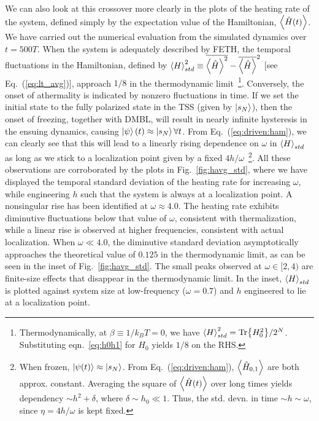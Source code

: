 \documentclass[%
reprint,
superscriptaddress,
amsmath,amssymb,
aps,
prb,
showkeys,
]{revtex4-2}
\begin{document}
We can also look at this crossover more clearly in the plots of the heating rate of the system, defined simply by the expectation value of the Hamiltonian, $\expval{\hat{H}(t)}$. We have carried out the numerical evaluation from the simulated dynamics over $t=500 T$. When the system is adequately described by FETH, the temporal fluctuations in the {Hamiltonian}, defined by $\expval{H}^2_{std}\equiv \overline{\expval{\hat{H}}^2}-\overline{\expval{\hat{H}}}^2$ [see Eq.~(\ref{eq:lt_avg})], approach $1/8$ in the thermodynamic limit~\footnote{Thermodynamically, at $\beta\equiv 1/k_BT=0$, we have $\expval{H}^2_{std}=\Tr{H^2_0}/2^N$. Substituting eqn.~\ref{eq:h0h1} for $H_0$ yields $1/8$ on the RHS.}. Conversely, the onset of athermality is indicated by nonzero fluctuations in time. If we set the initial state to the fully polarized state in the TSS (given by $\ket{s_N}$), then the 
onset of freezing, together with DMBL, will result in nearly infinite hysteresis in the ensuing dynamics, causing $\ket{\psi}(t)\approx \ket{s_N} \forall t$. From Eq.~(\ref{eq:driven:ham}), we can clearly see that this will lead to a linearly rising dependence on $\omega$ in $\expval{H}_{std}$ as long as we stick to a localization point given by a fixed $4h/\omega$~\footnote{When frozen, $\ket{\psi(t)}\approx \ket{s_N}$. From Eq.~(\ref{eq:driven:ham}), $\expval{\hat{H}_{0,1}}$ are both approx. constant. Averaging the square of $\expval{\hat{H}(t)}$ over long times yields dependency  $\sim h^2 + \delta$, where $\delta\sim h_0\ll 1$. Thus, the std. devn. in time $\sim h\sim \omega$, since $\eta=4h/\omega$ is kept fixed.}. All these observations are corroborated by the plots in Fig.~\ref{fig:havg_std}, where we have displayed the temporal standard deviation of the heating rate for increasing $\omega$, while engineering $h$ such that the system is always at a localization point. A nonsingular rise has been identified at $\omega \approx 4.0$. The heating rate exhibits diminutive fluctuations below that value of $\omega$, consistent with thermalization, while a linear rise is observed at higher frequencies, consistent with actual localization. When $\omega \ll 4.0$, the diminutive standard deviation asymptotically approaches the theoretical value of $0.125$ in the thermodynamic limit, as can be seen in the inset of Fig.~\ref{fig:havg_std}. The small peaks observed at $\omega\in [2, 4)$ are finite-size effects that disappear in the thermodynamic limit. In the inset, $\expval{H}_{std}$ is plotted against system size at low-frequency ($\omega=0.7$) and $h$ engineered to lie at a localization point.
\end{document}
